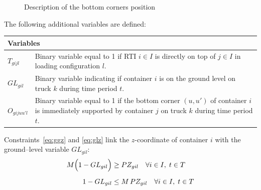 \begin{figure}[h!]
  \centering
  \caption{Description of the bottom corners position}
  \label{fig:M1}
\end{figure}

The following additional variables are defined:
\begin{table}[hbt!]
  \begin{tabular}{|p{}|p{}|}
    \hline
    \multicolumn{2}{|l|}{\textbf{Variables}}                                                                                                                                             \\ \hline
    \(T_{gijl}\)    & Binary variable equal to 1 if RTI \(i\in I\) is directly on top of \(j\in I\) in loading configuration \(l\).                                                      \\[0.5em]
    \(GL_{gil}\)    & Binary variable indicating if container \(i\) is on the ground level on truck \(k\) during time period \(t\).                                                      \\[0.5em]
    \(O_{gijuu'l}\) & Binary variable equal to 1 if the bottom corner \((u,u')\) of container \(i\) is immediately supported by container \(j\) on truck \(k\) during time period \(t\). \\ \hline
  \end{tabular}
\end{table}
\FloatBarrier

Constraints~\eqref{eq:ggz} and \eqref{eq:glz} link the \(z\)-coordinate of container \(i\) with the ground–level variable \(GL_{gil}\):
\begin{align}
  M\Bigl(1-GL_{gil}\Bigr) & \geq PZ_{gil} \quad \forall i \in I,\; t \in T \label{eq:ggz}    \\[0.5em]
  1-GL_{gil}              & \leq M\,PZ_{gil} \quad \forall i \in I,\; t \in T \label{eq:glz}
\end{align}

